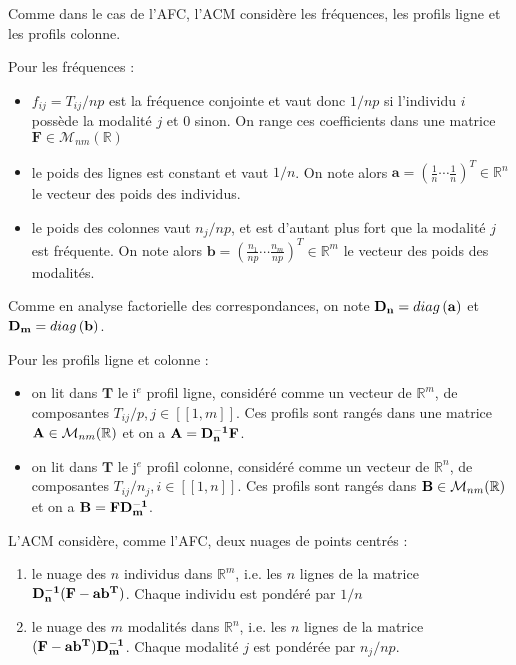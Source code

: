 \documentclass[letterpaper,10pt,french]{sphinxmanual}
\begin{document}
\sphinxAtStartPar
Comme dans le cas de l’AFC, l’ACM considère les fréquences, les profils ligne et les profils colonne.

\sphinxAtStartPar
Pour les fréquences :
\begin{itemize}
\item {} 
\sphinxAtStartPar
\(f_{ij}=T_{ij}/np\) est la fréquence conjointe et vaut donc \(1/np\) si l’individu \(i\) possède la modalité \(j\) et 0 sinon. On range ces coefficients dans une matrice \(\mathbf{F}\in\mathcal{M}_{nm}(\mathbb{R})\)

\item {} 
\sphinxAtStartPar
le poids des lignes est constant et vaut \(1/n\). On note alors \(\mathbf{a} = (\frac{1}{n}\cdots \frac{1}{n})^T\in\mathbb{R}^n\) le vecteur des poids des individus.

\item {} 
\sphinxAtStartPar
le poids des colonnes vaut \(n_j/np\), et est d’autant plus fort que la modalité \(j\) est fréquente. On note alors \(\mathbf{b} = (\frac{n_1}{np}\cdots \frac{n_m}{np})^T\in\mathbb{R}^m\) le vecteur des poids des modalités.

\end{itemize}

\sphinxAtStartPar
Comme en analyse factorielle des correspondances, on note \({\bf D_n}=diag\left ({\bf a}\right )\) et \({\bf D_m}=diag\left ({\bf b} \right )\).

\sphinxAtStartPar
Pour les profils ligne et colonne :
\begin{itemize}
\item {} 
\sphinxAtStartPar
on lit dans \(\mathbf T\) le i\(^e\) profil ligne, considéré comme un vecteur de \(\mathbb{R}^m\), de composantes \(T_{ij}/p,j\in[\![1,m]\!]\). Ces profils sont rangés dans une matrice \({\bf A}\in\mathcal{M}_{nm}(\mathbb{R})\) et on a \({\bf A}={\bf D_n^{-1}F}\).

\item {} 
\sphinxAtStartPar
on lit dans \(\mathbf T\) le j\(^e\) profil colonne, considéré comme un vecteur de \(\mathbb{R}^n\), de composantes \(T_{ij}/n_j,i\in[\![1,n]\!]\). Ces profils sont rangés dans \({\bf B}\in\mathcal{M}_{nm}(\mathbb{R})\) et on a \({\bf B}={\bf FD_m^{-1}}\).

\end{itemize}

\sphinxAtStartPar
L’ACM considère, comme l’AFC, deux nuages de points centrés :
\begin{enumerate}
%
\item {} 
\sphinxAtStartPar
le nuage des \(n\) individus dans \(\mathbb{R}^m\), i.e. les \(n\) lignes de la matrice \({\bf D_n^{-1}(F-ab^T})\). Chaque individu est pondéré par \(1/n\)

\item {} 
\sphinxAtStartPar
le nuage des \(m\) modalités dans \(\mathbb{R}^n\), i.e. les \(n\) lignes de la matrice \({\bf (F-ab^T)D_m^{-1}}\). Chaque modalité \(j\) est pondérée par \(n_j/np\).

\end{enumerate}
\end{document}
